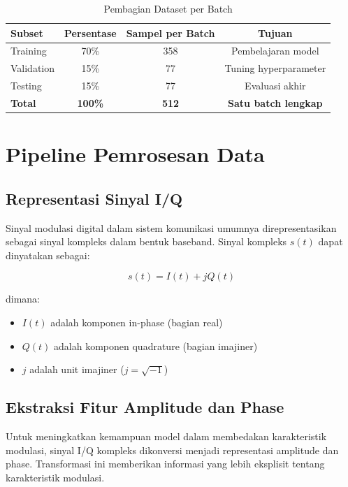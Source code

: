 \documentclass{article}
\begin{document}
\begin{table}[h]
\centering
\caption{Pembagian Dataset per Batch}
\label{tab:data_split}
\begin{tabular}{|l|c|c|c|}
\hline
\textbf{Subset} & \textbf{Persentase} & \textbf{Sampel per Batch} & \textbf{Tujuan} \\
\hline
Training & 70\% & 358 & Pembelajaran model \\
Validation & 15\% & 77 & Tuning hyperparameter \\
Testing & 15\% & 77 & Evaluasi akhir \\
\hline
\textbf{Total} & \textbf{100\%} & \textbf{512} & \textbf{Satu batch lengkap} \\
\hline
\end{tabular}
\end{table}

\section{Pipeline Pemrosesan Data}

\subsection{Representasi Sinyal I/Q}
Sinyal modulasi digital dalam sistem komunikasi umumnya direpresentasikan sebagai sinyal kompleks dalam bentuk baseband. Sinyal kompleks $s(t)$ dapat dinyatakan sebagai:

\begin{equation}
s(t) = I(t) + jQ(t)
\label{eq:complex_signal}
\end{equation}

dimana:
\begin{itemize}
    \item $I(t)$ adalah komponen in-phase (bagian real)
    \item $Q(t)$ adalah komponen quadrature (bagian imajiner)  
    \item $j$ adalah unit imajiner ($j = \sqrt{-1}$)
\end{itemize}

\subsection{Ekstraksi Fitur Amplitude dan Phase}
Untuk meningkatkan kemampuan model dalam membedakan karakteristik modulasi, sinyal I/Q kompleks dikonversi menjadi representasi amplitude dan phase. Transformasi ini memberikan informasi yang lebih eksplisit tentang karakteristik modulasi.
\end{document}
